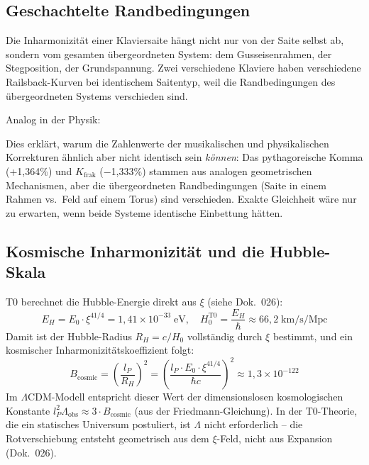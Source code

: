 \subsection{Geschachtelte Randbedingungen}

Die Inharmonizität einer Klaviersaite hängt nicht nur von der Saite selbst ab, sondern vom gesamten übergeordneten System: dem Gusseisenrahmen, der Stegposition, der Grundspannung. Zwei verschiedene Klaviere haben verschiedene Railsback-Kurven bei identischem Saitentyp, weil die Randbedingungen des übergeordneten Systems verschieden sind.

Analog in der Physik:
\begin{center}
\end{center}

Dies erklärt, warum die Zahlenwerte der musikalischen und physikalischen Korrekturen ähnlich aber nicht identisch sein \emph{können}: Das pythagoreische Komma (+1,364\%) und $K_\text{frak}$ ($-$1,333\%) stammen aus analogen geometrischen Mechanismen, aber die übergeordneten Randbedingungen (Saite in einem Rahmen vs.\ Feld auf einem Torus) sind verschieden. Exakte Gleichheit wäre nur zu erwarten, wenn beide Systeme identische Einbettung hätten.

\subsection{Kosmische Inharmonizität und die Hubble-Skala}

T0 berechnet die Hubble-Energie direkt aus $\xi$ (siehe Dok.~026):
\begin{equation}
	E_H = E_0 \cdot \xi^{41/4} = 1{,}41 \times 10^{-33}\;\text{eV}, \quad H_0^{\text{T0}} = \frac{E_H}{\hbar} \approx 66{,}2\;\text{km/s/Mpc}
\end{equation}
Damit ist der Hubble-Radius $R_H = c/H_0$ vollständig durch $\xi$ bestimmt, und ein kosmischer Inharmonizitätskoeffizient folgt:
\begin{equation}
	B_\text{cosmic} = \left(\frac{l_P}{R_H}\right)^2 = \left(\frac{l_P \cdot E_0 \cdot \xi^{41/4}}{\hbar c}\right)^2 \approx 1{,}3 \times 10^{-122}
\end{equation}
Im $\Lambda$CDM-Modell entspricht dieser Wert der dimensionslosen kosmologischen Konstante $l_P^2 \Lambda_\text{obs} \approx 3 \cdot B_\text{cosmic}$ (aus der Friedmann-Gleichung). In der T0-Theorie, die ein statisches Universum postuliert, ist $\Lambda$ nicht erforderlich -- die Rotverschiebung entsteht geometrisch aus dem $\xi$-Feld, nicht aus Expansion (Dok.~026).

